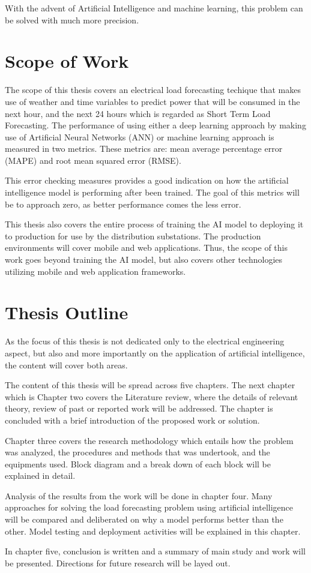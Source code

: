 \documentclass[12pt]{book}
\begin{document}
	With the advent of Artificial Intelligence and machine learning, this problem can be solved with much more precision.
\section{Scope of Work}
	The scope of this thesis covers an electrical load forecasting techique that makes use of weather and time variables to predict power that will be consumed in the next hour, and the next 24 hours which is regarded as Short Term Load Forecasting. The performance of using either a deep learning approach by making use of Artificial Neural Networks (ANN) or machine learning approach is measured in two metrics. These metrics are: mean average percentage error (MAPE) and root mean squared error (RMSE). 
	
	This error checking measures provides a good indication on how the artificial intelligence model is performing after been trained. The goal of this metrics will be to approach zero, as better performance comes the less error.
	
	This thesis also covers the entire process of training the AI model to deploying it to production for use by the distribution substations. The production environments will cover mobile and web applications. Thus, the scope of this work goes beyond training the AI model, but also covers other technologies utilizing mobile and web application frameworks.
	
\section{Thesis Outline}
	As the focus of this thesis is not dedicated only to the electrical engineering aspect, but also and more importantly on the application of artificial intelligence, the content will cover both areas. 
	
	The content of this thesis will be spread across five chapters. The next chapter which is Chapter two covers the Literature review, where the details of relevant theory, review of past or reported work will be addressed. The chapter is concluded with a brief introduction of the proposed work or solution.
	
	Chapter three covers the research methodology which entails how the problem was analyzed, the procedures and methods that was undertook, and the equipments used. Block diagram and a break down of each block will be explained in detail.
	
	Analysis of the results from the work will be done in chapter four. Many approaches for solving the load forecasting problem using artificial intelligence will be compared and deliberated on why a model performs better than the other. 
	Model testing and deployment activities will be explained in this chapter.
	
	In chapter five, conclusion is written and a summary of main study and work will be presented. Directions for future research will be layed out.
\end{document}
